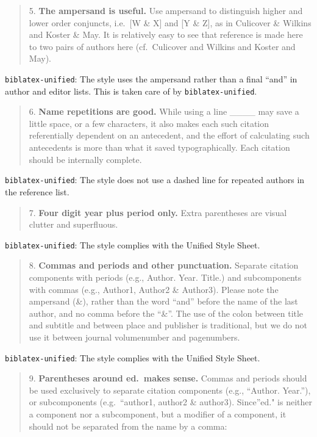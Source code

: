 \documentclass[
]{article}
\begin{document}
\begin{quote}
5. \textbf{The ampersand is useful.} Use ampersand to distinguish higher
and lower order conjuncts, i.e.~{[}W \& X{]} and {[}Y \& Z{]}, as in
Culicover \& Wilkins and Koster \& May. It is relatively easy to see
that reference is made here to two pairs of authors here (cf.~Culicover
and Wilkins and Koster and May).
\end{quote}

\texttt{biblatex-unified}: The style uses the ampersand rather than a
final ``and'' in author and editor lists. This is taken care of by
\texttt{biblatex-unified}.

\begin{quote}
6. \textbf{Name repetitions are good.} While using a line \_\_\_\_ may
save a little space, or a few characters, it also makes each such
citation referentially dependent on an antecedent, and the effort of
calculating such antecedents is more than what it saved typographically.
Each citation should be internally complete.
\end{quote}

\texttt{biblatex-unified}: The style does not use a dashed line for
repeated authors in the reference list.

\begin{quote}
7. \textbf{Four digit year plus period only.} Extra parentheses are
visual clutter and superfluous.
\end{quote}

\texttt{biblatex-unified}: The style complies with the Unified Style
Sheet.

\begin{quote}
8. \textbf{Commas and periods and other punctuation.} Separate citation
components with periods (e.g., Author. Year. Title.) and subcomponents
with commas (e.g., Author1, Author2 \& Author3). Please note the
ampersand (\&), rather than the word ``and'' before the name of the last
author, and no comma before the ``\&''. The use of the colon between
title and subtitle and between place and publisher is traditional, but
we do not use it between journal volumenumber and pagenumbers.
\end{quote}

\texttt{biblatex-unified}: The style complies with the Unified Style
Sheet.

\begin{quote}
9. \textbf{Parentheses around ed.~makes sense.} Commas and periods
should be used exclusively to separate citation components (e.g.,
``Author. Year.''), or subcomponents (e.g.~``author1, author2 \&
author3). Since''ed." is neither a component nor a subcomponent, but a
modifier of a component, it should not be separated from the name by a
comma:
\end{quote}
\end{document}
